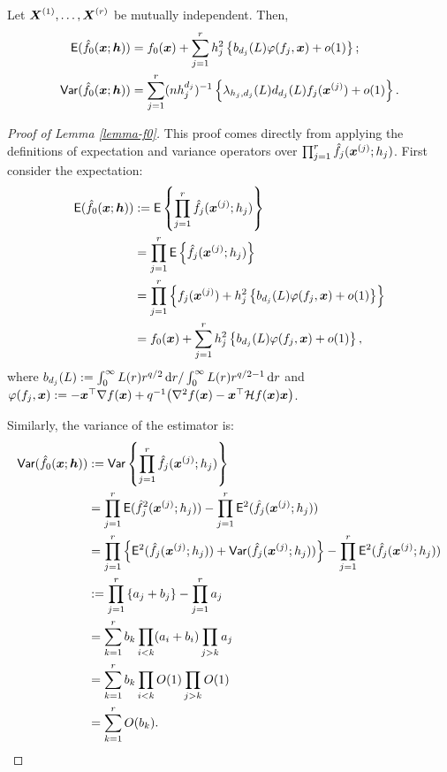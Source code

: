 \documentclass[oneside,11pt]{article}
\begin{document}
\begin{lemma}\label{lemma-f0}
    Let $\boldsymbol{X}^{(1)}, \dots, \boldsymbol{X}^{(r)}$ be mutually independent. Then,
    \begin{align*}
        \mathsf{E} (\hat{f}_{0}(\boldsymbol{x};{\boldsymbol{h}})) &= f_0(\boldsymbol{x}) + \sum_{j=1}^{r} h_j^2 \left\{b_{d_j}(L) \varphi (f_j,\boldsymbol{x}) + o(1)\right\};\\
        \mathsf{Var} (\hat{f}_{0}(\boldsymbol{x};{\boldsymbol{h}})) &= \sum_{j=1}^{r} (n h_j^{d_j})^{-1} \left\{\lambda_{h_j,d_j}(L) d_{d_j}(L) f_j(\boldsymbol{x}^{(j)}) + o(1)\right\}.
    \end{align*}
\end{lemma}
\begin{proof}[Proof of Lemma \ref{lemma-f0}]
This proof comes directly from applying the definitions of expectation and variance operators over $\prod_{j=1}^{r} \hat{f}_{j}(\boldsymbol{x}^{(j)};h_j)$. First consider the expectation:
\begin{align*}
    \mathsf{E} (\hat{f}_{0}(\boldsymbol{x};{\boldsymbol{h}})) & := \mathsf{E} \left\{\prod_{j=1}^{r} \hat{f}_{j}(\boldsymbol{x}^{(j)};h_j)\right\} \\
    &= \prod_{j=1}^{r} \mathsf{E} \left\{ \hat{f}_{j}(\boldsymbol{x}^{(j)};h_j)\right\} \\
    &= \prod_{j=1}^{r} \left\{f_j(\boldsymbol{x}^{(j)}) + h_j^2 \left\{b_{d_j}(L) \varphi (f_j,\boldsymbol{x}) + o(1)\right\}\right\} \\
    &= f_0(\boldsymbol{x}) + \sum_{j=1}^{r} h_j^2 \left\{b_{d_j}(L) \varphi (f_j,\boldsymbol{x}) + o(1)\right\},
\end{align*}
where $b_{d_j}(L) := \int_{0}^{\infty} L(r)r^{q/2} \,\mathrm{d} r / \int_{0}^{\infty} L(r)r^{q/2-1} \,\mathrm{d} r$ and $\varphi (f_j,\boldsymbol{x}) := - \boldsymbol{x}^\top \nabla f(\boldsymbol{x}) + q^{-1} \big( \nabla^2 f(\boldsymbol{x}) - \boldsymbol{x}^\top \mathcal{H} f(\boldsymbol{x}) \boldsymbol{x} \big)$.

Similarly, the variance of the estimator is:
\begin{align*}
    \mathsf{Var} (\hat{f}_{0}(\boldsymbol{x};{\boldsymbol{h}})) & := \mathsf{Var} \left\{\prod_{j=1}^{r} \hat{f}_{j}(\boldsymbol{x}^{(j)};h_j)\right\} \\
    &= \prod_{j=1}^{r} \mathsf{E} (\hat{f}_{j}^2(\boldsymbol{x}^{(j)};h_j)) - \prod_{j=1}^{r} \mathsf{E}^2 (\hat{f}_{j}(\boldsymbol{x}^{(j)};h_j)) \\
    &= \prod_{j=1}^{r} \left\{\mathsf{E}^2(\hat{f}_{j}(\boldsymbol{x}^{(j)};h_j)) + \mathsf{Var}(\hat{f}_{j}(\boldsymbol{x}^{(j)};h_j))\right\} - \prod_{j=1}^{r} \mathsf{E}^2 (\hat{f}_{j}(\boldsymbol{x}^{(j)};h_j)) \\
    &:= \prod_{j=1}^{r} \left\{a_j + b_j\right\} - \prod_{j=1}^{r} a_j\\
    &=\sum_{k=1}^r b_k \prod_{i<k} (a_i+b_i) \prod_{j>k} a_j\\
    &=\sum_{k=1}^r b_k \prod_{i<k} O(1) \prod_{j>k} O(1)\\
    &=\sum_{k=1}^r O(b_k).
\end{align*}


\end{proof}
\end{document}
